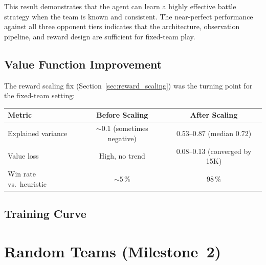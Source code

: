 
This result demonstrates that the agent can learn a highly effective battle
strategy when the team is known and consistent.  The near-perfect performance
against all three opponent tiers indicates that the architecture, observation
pipeline, and reward design are sufficient for fixed-team play.

\subsection{Value Function Improvement}

The reward scaling fix (Section~\ref{sec:reward_scaling}) was the turning
point for the fixed-team setting:

\begin{center}
\small
\begin{tabularx}{\textwidth}{l c c}
  \toprule
  \textbf{Metric} & \textbf{Before Scaling} & \textbf{After Scaling} \\
  \midrule
  Explained variance & ${\sim}0.1$ (sometimes negative) & 0.53--0.87 (median 0.72) \\
  Value loss         & High, no trend                     & 0.08--0.13 (converged by 15K) \\
  Win rate vs.\ heuristic & ${\sim}5$\,\%               & 98\,\% \\
  \bottomrule
\end{tabularx}
\end{center}


\subsection{Training Curve}


\section{Random Teams (Milestone~2)}

